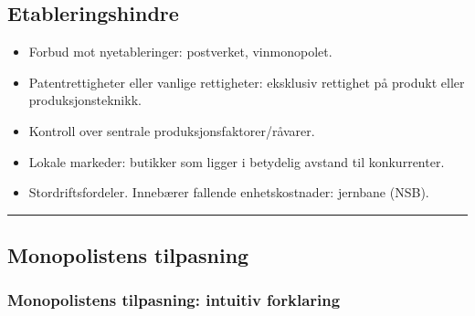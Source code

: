 \documentclass[
  letterpaper,
  DIV=11,
  numbers=noendperiod]{scrartcl}
\providecommand{\tightlist}{%
  \setlength{\itemsep}{0pt}\setlength{\parskip}{0pt}}\usepackage{longtable,booktabs,array}
\begin{document}
\subsection{Etableringshindre}\label{etableringshindre}

\begin{itemize}
\tightlist
\item
  Forbud mot nyetableringer: postverket, vinmonopolet.
\item
  Patentrettigheter eller vanlige rettigheter: eksklusiv rettighet på
  produkt eller produksjonsteknikk.
\item
  Kontroll over sentrale produksjonsfaktorer/råvarer.
\item
  Lokale markeder: butikker som ligger i betydelig avstand til
  konkurrenter.
\item
  Stordriftsfordeler. Innebærer fallende enhetskostnader: jernbane
  (NSB).
\end{itemize}

\begin{center}\rule{0.5\linewidth}{0.5pt}\end{center}

\subsection{Monopolistens tilpasning}\label{monopolistens-tilpasning}

\subsubsection{Monopolistens tilpasning: intuitiv
forklaring}\label{monopolistens-tilpasning-intuitiv-forklaring}
\end{document}
